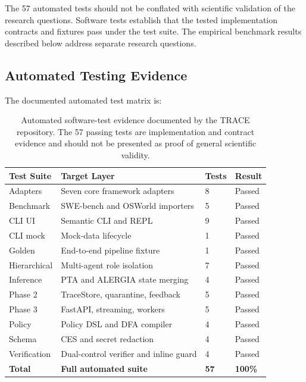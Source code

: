 \documentclass[11pt,a4paper]{article}
\begin{document}
The 57 automated tests should not be conflated with scientific validation of the
research questions. Software tests establish that the tested implementation contracts
and fixtures pass under the test suite. The empirical benchmark results described below
address separate research questions.

\subsection{Automated Testing Evidence}

The documented automated test matrix is:

\begin{table}[!htbp]
\centering
\small
\begin{tabular}{L{5.2cm} L{5.8cm} C{1.4cm} C{2.0cm}}
\toprule
\textbf{Test Suite} & \textbf{Target Layer} & \textbf{Tests} & \textbf{Result} \\
\midrule
Adapters & Seven core framework adapters & 8 & Passed \\
Benchmark & SWE-bench and OSWorld importers & 5 & Passed \\
CLI UI & Semantic CLI and REPL & 9 & Passed \\
CLI mock & Mock-data lifecycle & 1 & Passed \\
Golden & End-to-end pipeline fixture & 1 & Passed \\
Hierarchical & Multi-agent role isolation & 7 & Passed \\
Inference & PTA and ALERGIA state merging & 4 & Passed \\
Phase 2 & TraceStore, quarantine, feedback & 5 & Passed \\
Phase 3 & FastAPI, streaming, workers & 5 & Passed \\
Policy & Policy DSL and DFA compiler & 4 & Passed \\
Schema & CES and secret redaction & 4 & Passed \\
Verification & Dual-control verifier and inline guard & 4 & Passed \\
\midrule
\textbf{Total} & \textbf{Full automated suite} & \textbf{57} & \textbf{100\%} \\
\bottomrule
\end{tabular}

\caption{Automated software-test evidence documented by the TRACE repository. The
57 passing tests are implementation and contract evidence and should not be presented
as proof of general scientific validity.}
\label{tab:tests}
\end{table}
\end{document}
